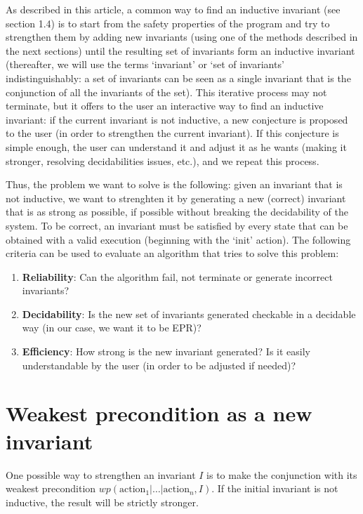 \documentclass[11pt,a4paper,oldfontcommands,openany]{memoir}
\begin{document}
    As described in this article\cite{Karbyshev:2017:PIU:3065931.3022187}, a common way to find an inductive invariant (see section 1.4) is to start from the safety properties of the program
    and try to strengthen them by adding new invariants (using one of the methods described in the next sections) until the resulting set of invariants form an inductive invariant
    (thereafter, we will use the terms `invariant' or `set of invariants' indistinguishably: a set of invariants can be seen as a single invariant that is the conjunction of all the invariants of the set).
    This iterative process may not terminate, but it offers to the user an interactive way to find an inductive invariant:
    if the current invariant is not inductive, a new conjecture is proposed to the user (in order to strengthen the current invariant).
    If this conjecture is simple enough, the user can understand it and adjust it as he wants (making it stronger, resolving decidabilities issues, etc.), and we repeat this process.

    Thus, the problem we want to solve is the following:
    given an invariant that is not inductive, we want to strenghten it by generating a new (correct) invariant that is as strong as possible, if possible without breaking the decidability of the system.
    To be correct, an invariant must be satisfied by every state that can be obtained with a valid execution (beginning with the `init' action).
    The following criteria can be used to evaluate an algorithm that tries to solve this problem:
    \begin{enumerate}
        \item \textbf{Reliability}: Can the algorithm fail, not terminate or generate incorrect invariants?
        \item \textbf{Decidability}: Is the new set of invariants generated checkable in a decidable way (in our case, we want it to be EPR)?
        \item \textbf{Efficiency}: How strong is the new invariant generated? Is it easily understandable by the user (in order to be adjusted if needed)?
    \end{enumerate}

    \section{Weakest precondition as a new invariant}

    One possible way to strengthen an invariant \(I\) is to make the conjunction with its weakest precondition \(wp(\text{action}_1|\ldots|\text{action}_n,I)\).
    If the initial invariant is not inductive, the result will be strictly stronger.
\end{document}
